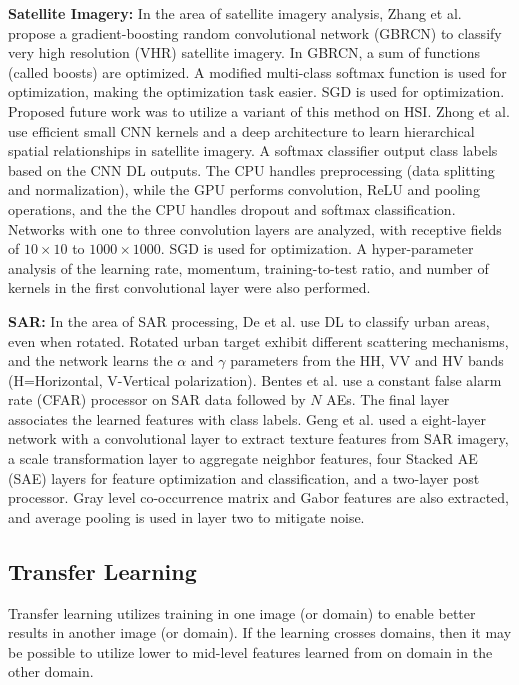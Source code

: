 \documentclass[12pt]{spieman}
\begin{document}
\begin{spacing}{1}
\textbf{Satellite Imagery:} In the area of satellite imagery analysis, Zhang et al. \cite{zhang2016scene} propose a gradient-boosting random convolutional network (GBRCN) to classify very high resolution (VHR) satellite imagery. In GBRCN, a sum of functions (called boosts) are optimized. A modified multi-class softmax function is used for optimization, making the optimization task easier. SGD is used for optimization. Proposed future work was to utilize a variant of this method on HSI. Zhong et al. \cite{zhong2017satcnn} use efficient small CNN kernels and a deep architecture to learn hierarchical spatial relationships in satellite imagery. A softmax classifier output class labels based on the CNN DL outputs. The CPU handles preprocessing (data splitting and normalization), while the GPU performs convolution, ReLU and pooling operations, and the the CPU handles dropout and softmax classification. Networks with one to three convolution layers are analyzed, with receptive fields of $10 \times 10$ to $1000 \times 1000$. SGD is used for optimization. A hyper-parameter analysis of the learning rate, momentum, training-to-test ratio, and number of kernels in the first convolutional layer were also performed.

\textbf{SAR:} In the area of SAR processing, De et al. \cite{de2015urban} use DL to classify urban areas, even when rotated. Rotated urban target exhibit different scattering mechanisms, and the network learns the $\alpha$ and $\gamma$ parameters from the HH, VV and HV bands (H=Horizontal, V-Vertical polarization). Bentes et al. \cite{bentes2015target} use a constant false alarm rate (CFAR) processor on SAR data followed by $N$ AEs. The final layer associates the learned features with class labels. Geng et al. \cite{Geng2015SAR} used a eight-layer network with a convolutional layer to extract texture features from SAR imagery, a scale transformation layer to aggregate neighbor features, four Stacked AE (SAE) layers for feature optimization and classification, and a two-layer post processor. Gray level co-occurrence matrix and Gabor features are also extracted, and average pooling is used in layer two to mitigate noise.

\subsection{Transfer Learning}

Transfer learning utilizes training in one image (or domain) to enable better results in another image (or domain). If the learning crosses domains, then it may be possible to utilize lower to mid-level features learned from on domain in the other domain.


\end{spacing}
\end{document}
